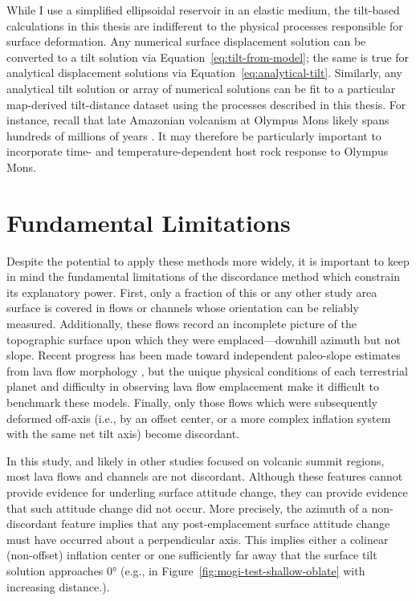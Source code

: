 While I use a simplified ellipsoidal reservoir in an elastic medium, the tilt-based calculations in this thesis are indifferent to the physical processes responsible for surface deformation. Any numerical surface displacement solution can be converted to a tilt solution via Equation~\eqref{eq:tilt-from-model}; the same is true for analytical displacement solutions via Equation~\eqref{eq:analytical-tilt}. Similarly, any analytical tilt solution or array of numerical solutions can be fit to a particular map-derived tilt-distance dataset using the processes described in this thesis. For instance, recall that late Amazonian volcanism at Olympus Mons likely spans hundreds of millions of years \parencite{neukum_recent_2004}. It may therefore be particularly important to incorporate time- and temperature-dependent host rock response \parencite[e.g.,][]{gregg_catastrophic_2012} to Olympus Mons.

\section{Fundamental Limitations}

Despite the potential to apply these methods more widely, it is important to keep in mind the fundamental limitations of the discordance method which constrain its explanatory power. First, only a fraction of this or any other study area surface is covered in flows or channels whose orientation can be reliably measured. Additionally, these flows record an incomplete picture of the topographic surface upon which they were emplaced---downhill azimuth but not slope. Recent progress has been made toward independent paleo-slope estimates from lava flow morphology \parencite{wadge_lobes_1991, peitersen_correlations_2000, peters_lava_2021}, but the unique physical conditions of each terrestrial planet and difficulty in observing lava flow emplacement make it difficult to benchmark these models. Finally, only those flows which were subsequently deformed off-axis (i.e., by an offset center, or a more complex inflation system with the same net tilt axis) become discordant.

In this study, and likely in other studies focused on volcanic summit regions, most lava flows and channels are not discordant. Although these features cannot provide evidence for underling surface attitude change, they can provide evidence that such attitude change did not occur. More precisely, the azimuth of a non-discordant feature implies that any post-emplacement surface attitude change must have occurred about a perpendicular axis. This implies either a colinear (non-offset) inflation center or one sufficiently far away that the surface tilt solution approaches \ang{0} (e.g., in Figure~\ref{fig:mogi-test-shallow-oblate} with increasing distance.).

